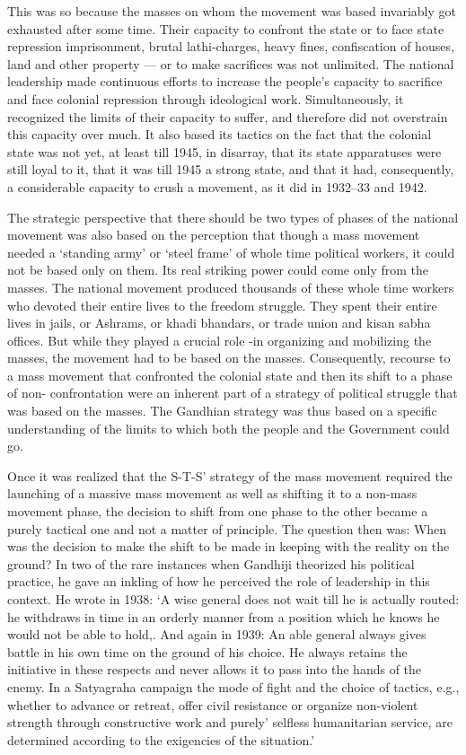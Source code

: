 This was so because the masses on whom the movement was based invariably got exhausted after some time. Their capacity to confront the state or to face state repression imprisonment, brutal lathi-charges, heavy fines, confiscation of houses, land and other property --- or to make sacrifices was not unlimited. The national leadership made continuous efforts to increase the people's capacity to sacrifice and face colonial repression through ideological work. Simultaneously, it recognized the limits of their capacity to suffer, and therefore did not overstrain this capacity over much. It also based its tactics on the fact that the colonial state was not yet, at least till 1945, in disarray, that its state apparatuses were still loyal to it, that it was till 1945 a strong state, and that it had, consequently, a considerable capacity to crush a movement, as it did in 1932--33 and 1942.

The strategic perspective that there should be two types of phases of the national movement was also based on the perception that though a mass movement needed a `standing army' or `steel frame' of whole time political workers, it could not be based only on them. Its real striking power could come only from the masses. The national movement produced thousands of these whole time workers who devoted their entire lives to the freedom struggle. They spent their entire lives in jails, or Ashrams, or khadi bhandars, or trade union and kisan sabha offices. But while they played a crucial role -in organizing and mobilizing the masses, the movement had to be based on the masses. Consequently, recourse to a mass movement that confronted the colonial state and then its shift to a phase of non- confrontation were an inherent part of a strategy of political struggle that was based on the masses. The Gandhian strategy was thus based on a specific understanding of the limits to which both the people and the Government could go.

Once it was realized that the S-T-S' strategy of the mass movement required the launching of a massive mass movement as well as shifting it to a non-mass movement phase, the decision to shift from one phase to the other became a purely tactical one and not a matter of principle. The question then was: When was the decision to make the shift to be made in keeping with the reality on the ground? In two of the rare instances when Gandhiji theorized his political practice, he gave an inkling of how he perceived the role of leadership in this context. He wrote in 1938: `A wise general does not wait till he is actually routed: he withdraws in time in an orderly manner from a position which he knows he would not be able to hold,. And again in 1939: An able general always gives battle in his own time on the ground of his choice. He always retains the initiative in these respects and never allows it to pass into the hands of the enemy. In a Satyagraha campaign the mode of fight and the choice of tactics, e.g., whether to advance or retreat, offer civil resistance or organize non-violent strength through constructive work and purely' selfless humanitarian service, are determined according to the exigencies of the situation.'

